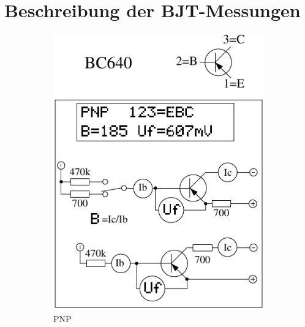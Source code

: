 \chapter{Beschreibung der BJT-Messungen}
\label{sec:BJTmeasurements}

\begin{figure}[H]
  \begin{subfigure}[b]{.5\textwidth}
    \centering
    \includegraphics[width=1.\textwidth]{../FIG/BJT_BC640.pdf}
    \caption{PNP}
    \label{fig:BJT-PNP}
  \end{subfigure}
  ~
  \begin{subfigure}[b]{.5\textwidth}
    \centering

\end{subfigure}
\end{figure}
